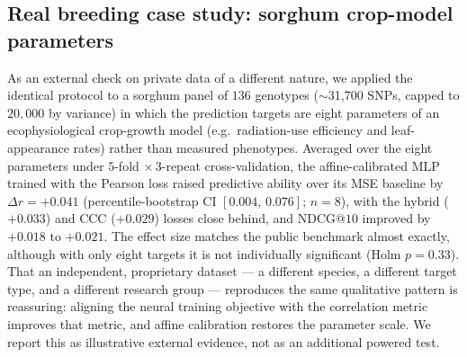 \subsection{Real breeding case study: sorghum crop-model parameters}\label{sec:res-sorghum}
As an external check on private data of a different nature, we applied the
identical protocol to a sorghum panel of $136$ genotypes ($\sim$31{,}700 SNPs,
capped to $20{,}000$ by variance) in which the prediction targets are eight
parameters of an ecophysiological crop-growth model (e.g.\ radiation-use
efficiency and leaf-appearance rates) rather than measured phenotypes. Averaged
over the eight parameters under $5$-fold $\times\,3$-repeat cross-validation, the
affine-calibrated MLP trained with the Pearson loss raised predictive ability over
its MSE baseline by $\Delta r=+0.041$ (percentile-bootstrap CI $[0.004,\,0.076]$; $n=8$), with the hybrid
($+0.033$) and CCC ($+0.029$) losses close behind, and NDCG@$10$ improved by
$+0.018$ to $+0.021$. The effect size matches the public benchmark almost exactly,
although with only eight targets it is not individually significant (Holm
$p=0.33$). That an independent, proprietary dataset --- a different species, a
different target type, and a different research group --- reproduces the same
qualitative pattern is reassuring: aligning the neural training objective with the
correlation metric improves that metric, and affine calibration restores the
parameter scale. We report this as illustrative external evidence, not as an
additional powered test.
